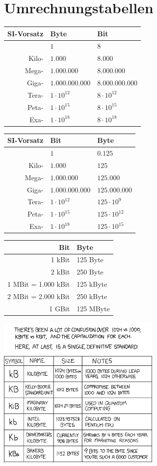 \documentclass[10pt,a4paper,notitlepage]{scrartcl}
\begin{document}
\newpage
\section{Umrechnungstabellen}
\begin{center}
\begin{tabularx}{8cm}{r|l|l}
\textbf{SI-Vorsatz}&\textbf{Byte}&\textbf{Bit}\\
\hline
&$1$&$8$\\
Kilo-&$1.000$&$8.000$\\
Mega-&$1.000.000$&$8.000.000$\\
Giga-&$1.000.000.000$&$8.000.000.000$\\
Tera-&$1\cdot 10^{12}$&$8\cdot 10^{12}$\\
Peta-&$1\cdot 10^{15}$&$8\cdot 10^{15}$\\
Exa-&$1\cdot 10^{18}$&$8\cdot 10^{18}$
\end{tabularx}
\hspace{5mm}
\begin{tabularx}{8cm}{r|l|l}
\textbf{SI-Vorsatz}&\textbf{Bit}&\textbf{Byte}\\
\hline
&$1$&$0.125$\\
Kilo-&$1.000$&$125$\\
Mega-&$1.000.000$&$125.000$\\
Giga-&$1.000.000.000$&$125.000.000$\\
Tera-&$1\cdot 10^{12}$&$125\cdot 10^{9}$\\
Peta-&$1\cdot 10^{15}$&$125\cdot 10^{12}$\\
Exa-&$1\cdot 10^{18}$&$125\cdot 10^{15}$
\end{tabularx}
\end{center}
\begin{center}
\begin{tabularx}{8cm}{r|l}
\textbf{Bit}&\textbf{Byte}\\
\hline
1 kBit&125 Byte\\
2 kBit&250 Byte\\
1 MBit = 1.000 kBit&125 kByte\\
2 MBit = 2.000 kBit&250 kByte\\
1 GBit&125 MByte\\
\end{tabularx}
\hspace{5mm}
\begin{minipage}{8cm}
\includegraphics[width=8cm]{0394-kilobyte.png}
\end{minipage}
\end{center}
\end{document}
